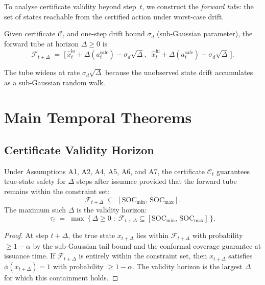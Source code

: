 To analyse certificate validity beyond step~$t$, we construct the
\emph{forward tube}: the set of states reachable from the certified
action under worst-case drift.

\begin{definition}
\label{def:forward-tube}
Given certificate $\mathcal{C}_t$ and one-step drift bound
$\sigma_d$ (sub-Gaussian parameter), the forward tube at horizon
$\Delta \ge 0$ is
\[
  \mathcal{F}_{t+\Delta} \;=\;
  \bigl[\,\hat{x}_t^{\text{lo}} + \Delta(a_t^{\text{safe}}) -
  \sigma_d\sqrt{\Delta},\;\;
  \hat{x}_t^{\text{hi}} + \Delta(a_t^{\text{safe}}) +
  \sigma_d\sqrt{\Delta}\,\bigr].
\]
\end{definition}

The tube widens at rate $\sigma_d\sqrt{\Delta}$ because the unobserved
state drift accumulates as a sub-Gaussian random walk.

\section{Main Temporal Theorems}

\subsection{Certificate Validity Horizon}

\begin{theorem}
\label{thm:cert-horizon}
Under Assumptions A1, A2, A4, A5, A6, and A7, the certificate
$\mathcal{C}_t$ guarantees true-state safety for $\Delta$ steps after
issuance provided that the forward tube remains within the constraint
set:
\[
  \mathcal{F}_{t+\Delta} \;\subseteq\;
  [\text{SOC}_{\min},\, \text{SOC}_{\max}].
\]
The maximum such $\Delta$ is the validity horizon:
\[
  \tau_t \;=\; \max\,\bigl\{\,\Delta \ge 0 \;:\;
  \mathcal{F}_{t+\Delta} \subseteq
  [\text{SOC}_{\min},\, \text{SOC}_{\max}]\,\bigr\}.
\]
\end{theorem}

\begin{proof}
At step $t + \Delta$, the true state $x_{t+\Delta}$ lies within
$\mathcal{F}_{t+\Delta}$ with probability $\ge 1 - \alpha$
by the sub-Gaussian tail bound and the conformal coverage guarantee at
issuance time.  If $\mathcal{F}_{t+\Delta}$ is entirely within the
constraint set, then $x_{t+\Delta}$ satisfies $\phi(x_{t+\Delta}) = 1$
with probability $\ge 1 - \alpha$.  The validity horizon is the largest
$\Delta$ for which this containment holds.
\end{proof}


